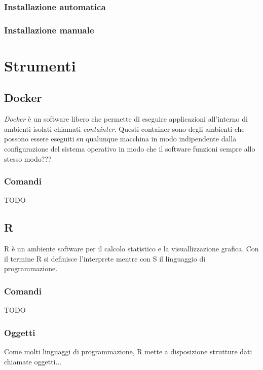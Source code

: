 \documentclass[10pt,titlepage,twoside,a4paper]{report}
\begin{document}
        \subsection{Installazione automatica}
        \subsection{Installazione manuale}



\chapter{Strumenti}


    \section{Docker}
\emph{Docker} è un software libero che permette di eseguire applicazioni 
all'interno di ambienti isolati chiamati
\emph{containter}. Questi container sono degli ambienti che 
possono essere eseguiti su qualunque macchina in modo indipendente dalla 
configurazione del sistema operativo in modo che il software 
funzioni sempre allo stesso modo???\cite{docker}

        \subsection{Comandi}
TODO



    \section{R}
R è un ambiente software per il calcolo statistico e la 
visuallizzazione grafica. Con il termine R si definisce l'interprete
mentre con S il linguaggio di programmazione.

        \subsection{Comandi}
TODO

        \subsection{Oggetti}
Come molti linguaggi di programmazione, R mette a disposizione strutture dati 
chiamate oggetti...
\end{document}
